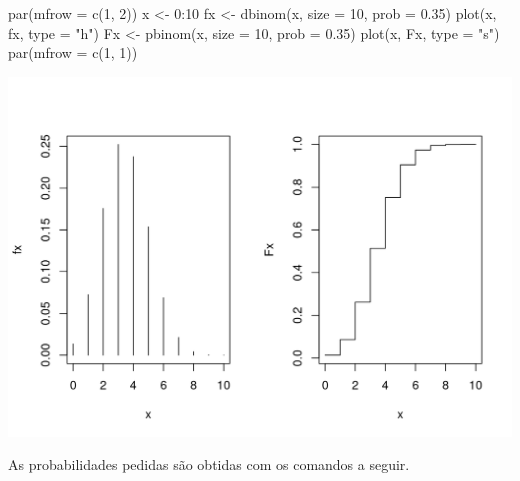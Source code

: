 \documentclass[
  10pt,
  a4paper]{book}
\newenvironment{Shaded}{\begin{snugshade}}{\end{snugshade}}
\newcommand{\AttributeTok}[1]{\textcolor[rgb]{0.77,0.63,0.00}{#1}}
\newcommand{\DecValTok}[1]{\textcolor[rgb]{0.00,0.00,0.81}{#1}}
\newcommand{\FloatTok}[1]{\textcolor[rgb]{0.00,0.00,0.81}{#1}}
\newcommand{\FunctionTok}[1]{\textcolor[rgb]{0.00,0.00,0.00}{#1}}
\newcommand{\NormalTok}[1]{#1}
\newcommand{\OtherTok}[1]{\textcolor[rgb]{0.56,0.35,0.01}{#1}}
\newcommand{\SpecialCharTok}[1]{\textcolor[rgb]{0.00,0.00,0.00}{#1}}
\newcommand{\StringTok}[1]{\textcolor[rgb]{0.31,0.60,0.02}{#1}}
\begin{document}
\begin{Shaded}
\begin{Highlighting}[]
\FunctionTok{par}\NormalTok{(}\AttributeTok{mfrow =} \FunctionTok{c}\NormalTok{(}\DecValTok{1}\NormalTok{, }\DecValTok{2}\NormalTok{))}
\NormalTok{x }\OtherTok{\textless{}{-}} \DecValTok{0}\SpecialCharTok{:}\DecValTok{10}
\NormalTok{fx }\OtherTok{\textless{}{-}} \FunctionTok{dbinom}\NormalTok{(x, }\AttributeTok{size =} \DecValTok{10}\NormalTok{, }\AttributeTok{prob =} \FloatTok{0.35}\NormalTok{)}
\FunctionTok{plot}\NormalTok{(x, fx, }\AttributeTok{type =} \StringTok{"h"}\NormalTok{)}
\NormalTok{Fx }\OtherTok{\textless{}{-}} \FunctionTok{pbinom}\NormalTok{(x, }\AttributeTok{size =} \DecValTok{10}\NormalTok{, }\AttributeTok{prob =} \FloatTok{0.35}\NormalTok{)}
\FunctionTok{plot}\NormalTok{(x, Fx, }\AttributeTok{type =} \StringTok{"s"}\NormalTok{)}
\FunctionTok{par}\NormalTok{(}\AttributeTok{mfrow =} \FunctionTok{c}\NormalTok{(}\DecValTok{1}\NormalTok{, }\DecValTok{1}\NormalTok{))}
\end{Highlighting}
\end{Shaded}

\begin{center}\includegraphics{figures/unnamed-chunk-351-1} \end{center}

As probabilidades pedidas são obtidas com os comandos a seguir.
\end{document}
